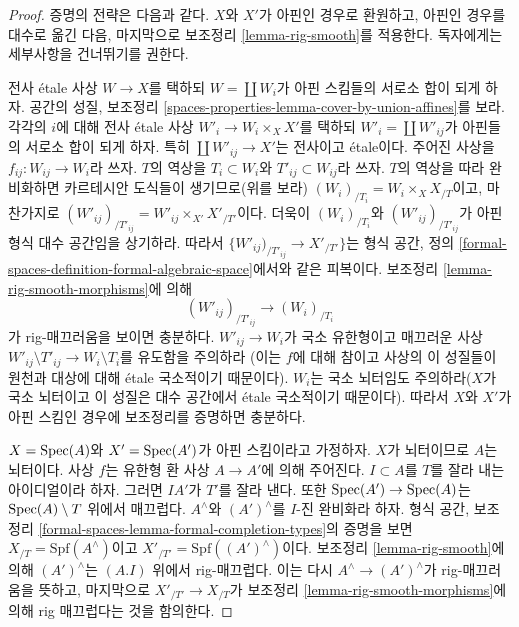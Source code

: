 \begin{proof}
증명의 전략은 다음과 같다. $X$와 $X'$가 아핀인 경우로 환원하고,
아핀인 경우를 대수로 옮긴 다음, 마지막으로 보조정리
\ref{lemma-rig-smooth}를 적용한다. 독자에게는 세부사항을 건너뛰기를
권한다.

\medskip\noindent
전사 \'etale 사상 $W \to X$를 택하되
$W = \coprod W_i$가 아핀 스킴들의 서로소 합이 되게 하자. 공간의 성질,
보조정리 \ref{spaces-properties-lemma-cover-by-union-affines}를 보라.
각각의 $i$에 대해 전사 \'etale 사상
$W'_i \to W_i \times_X X'$를 택하되
$W'_i = \coprod W'_{ij}$가 아핀들의 서로소 합이 되게 하자.
특히 $\coprod W'_{ij} \to X'$는 전사이고 \'etale이다.
주어진 사상을 $f_{ij} : W_{ij} \to W_i$라 쓰자.
$T$의 역상을 $T_i \subset W_i$와 $T'_{ij} \subset W_{ij}$라 쓰자.
$T$의 역상을 따라 완비화하면 카르테시안 도식들이 생기므로(위를 보라)
$(W_i)_{/T_i} = W_i \times_X X_{/T}$이고, 마찬가지로
$(W'_{ij})_{/T'_{ij}} = W'_{ij} \times_{X'} X'_{/T'}$이다.
더욱이 $(W_i)_{/T_i}$와 $(W'_{ij})_{/T'_{ij}}$가
아핀 형식 대수 공간임을 상기하라.
따라서 $\{W'_{ij})_{/T'_{ij}} \to X'_{/T'}\}$는 형식 공간, 정의
\ref{formal-spaces-definition-formal-algebraic-space}에서와 같은
피복이다. 보조정리 \ref{lemma-rig-smooth-morphisms}에 의해
$$
(W'_{ij})_{/T'_{ij}} \longrightarrow (W_i)_{/T_i}
$$
가 rig-매끄러움을 보이면 충분하다. $W'_{ij} \to W_i$가 국소 유한형이고
매끄러운 사상
$W'_{ij} \setminus T'_{ij} \to W_i \setminus T_i$를 유도함을 주의하라
(이는 $f$에 대해 참이고 사상의 이 성질들이 원천과 대상에 대해
\'etale 국소적이기 때문이다).
$W_i$는 국소 뇌터임도 주의하라($X$가 국소 뇌터이고 이 성질은
대수 공간에서 \'etale 국소적이기 때문이다).
따라서 $X$와 $X'$가 아핀 스킴인 경우에 보조정리를 증명하면 충분하다.

\medskip\noindent
$X = \mathop{\mathrm{Spec}}(A)$와 $X' = \mathop{\mathrm{Spec}}(A')$가 아핀 스킴이라고 가정하자.
$X$가 뇌터이므로 $A$는 뇌터이다.
사상 $f$는 유한형 환 사상 $A \to A'$에 의해 주어진다.
$I \subset A$를 $T$를 잘라 내는 아이디얼이라 하자. 그러면 $IA'$가
$T'$를 잘라 낸다. 또한 $\mathop{\mathrm{Spec}}(A') \to \mathop{\mathrm{Spec}}(A)$는
$\mathop{\mathrm{Spec}}(A) \setminus T$ 위에서 매끄럽다.
$A^\wedge$와 $(A')^\wedge$를 $I$-진 완비화라 하자.
형식 공간, 보조정리
\ref{formal-spaces-lemma-formal-completion-types}의 증명을 보면
$X_{/T} = \text{Spf}(A^\wedge)$이고
$X'_{/T'} = \text{Spf}((A')^\wedge)$이다.
보조정리 \ref{lemma-rig-smooth}에 의해
$(A')^\wedge$는 $(A. I)$ 위에서 rig-매끄럽다.
이는 다시 $A^\wedge \to (A')^\wedge$가 rig-매끄러움을 뜻하고,
마지막으로
$X'_{/T'} \to X_{/T}$가 보조정리
\ref{lemma-rig-smooth-morphisms}에 의해 rig 매끄럽다는 것을 함의한다.
\end{proof}

